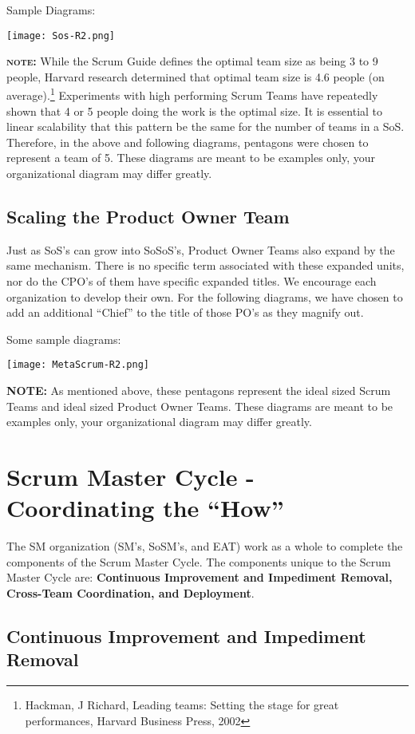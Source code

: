 \documentclass[12pt,a4paper,parskip=full]{scrartcl}
\begin{document}
Sample Diagrams:

\texttt{[image: Sos-R2.png]}

\textbf{\textsc{note:}} While the Scrum Guide defines the optimal team size as being 3 to 9 people, Harvard research determined that optimal team size is 4.6 people (on average).\footnote{Hackman, J Richard, Leading teams: Setting the stage for great performances, Harvard Business Press, 2002} Experiments with high performing Scrum Teams have repeatedly shown that 4 or 5 people doing the work is the optimal size. It is essential to linear scalability that this pattern be the same for the number of teams in a SoS. Therefore, in the above and following diagrams, pentagons were chosen to represent a team of 5. These diagrams are meant to be examples only, your organizational diagram may differ greatly.

\subsection{Scaling the Product Owner Team}

Just as SoS's can grow into SoSoS's, Product Owner Teams also expand by the same mechanism. There is no specific term associated with these expanded units, nor do the CPO's of them have specific expanded titles. We encourage each organization to develop their own. For the following diagrams, we have chosen to add an additional ``Chief'' to the title of those PO's as they magnify out.

Some sample diagrams:

\texttt{[image: MetaScrum-R2.png]}

\textbf{NOTE:} As mentioned above, these pentagons represent the ideal sized Scrum Teams and ideal sized Product Owner Teams. These diagrams are meant to be examples only, your organizational diagram may differ greatly.

\section{Scrum Master Cycle - Coordinating the ``How''}

The SM organization (SM's, SoSM's, and EAT) work as a whole to complete the components of the Scrum Master Cycle. The components unique to the Scrum Master Cycle are: \textbf{Continuous Improvement and Impediment Removal, Cross-Team Coordination, and Deployment}.

\subsection{Continuous Improvement and Impediment Removal}
\end{document}

